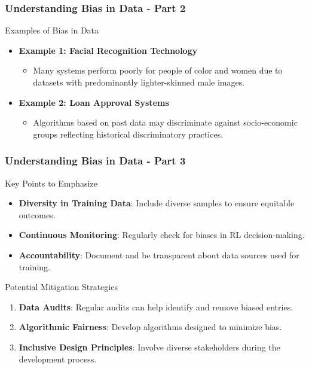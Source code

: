 \documentclass[aspectratio=169]{beamer}
\begin{document}
\begin{frame}[fragile]
    \frametitle{Understanding Bias in Data - Part 2}
    \begin{block}{Examples of Bias in Data}
        \begin{itemize}
            \item \textbf{Example 1: Facial Recognition Technology}
              \begin{itemize}
                  \item Many systems perform poorly for people of color and women due to datasets with predominantly lighter-skinned male images.
              \end{itemize}
            \item \textbf{Example 2: Loan Approval Systems}
              \begin{itemize}
                  \item Algorithms based on past data may discriminate against socio-economic groups reflecting historical discriminatory practices.
              \end{itemize}
        \end{itemize}
    \end{block}
\end{frame}

\begin{frame}[fragile]
    \frametitle{Understanding Bias in Data - Part 3}
    \begin{block}{Key Points to Emphasize}
        \begin{itemize}
            \item \textbf{Diversity in Training Data}: Include diverse samples to ensure equitable outcomes.
            \item \textbf{Continuous Monitoring}: Regularly check for biases in RL decision-making.
            \item \textbf{Accountability}: Document and be transparent about data sources used for training.
        \end{itemize}
    \end{block}
    
    \begin{block}{Potential Mitigation Strategies}
        \begin{enumerate}
            \item \textbf{Data Audits}: Regular audits can help identify and remove biased entries.
            \item \textbf{Algorithmic Fairness}: Develop algorithms designed to minimize bias.
            \item \textbf{Inclusive Design Principles}: Involve diverse stakeholders during the development process.
        \end{enumerate}
    \end{block}
\end{frame}
\end{document}
